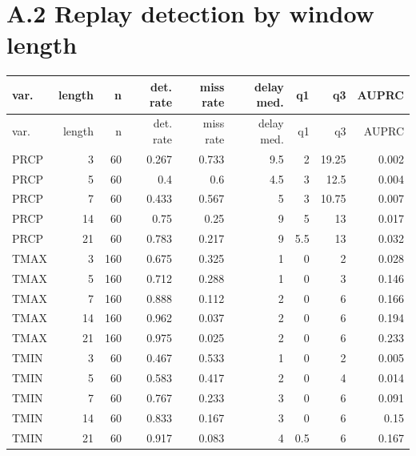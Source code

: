 \documentclass[10pt,a4paper]{article}
\begin{document}
\section*{A.2 Replay detection by window length}
{\small
\setlength{\tabcolsep}{3pt}
\setlength{\LTleft}{\fill}
\setlength{\LTright}{\fill}
\begin{longtable}{lrrrrrrrr}
\toprule
var. & length & n & det. rate & miss rate & delay med. & q1 & q3 & AUPRC \\
\midrule
\endfirsthead
\toprule
var. & length & n & det. rate & miss rate & delay med. & q1 & q3 & AUPRC \\
\midrule
\endhead
\bottomrule
\endlastfoot
PRCP & 3 & 60 & 0.267 & 0.733 & 9.5 & 2 & 19.25 & 0.002 \\
PRCP & 5 & 60 & 0.4 & 0.6 & 4.5 & 3 & 12.5 & 0.004 \\
PRCP & 7 & 60 & 0.433 & 0.567 & 5 & 3 & 10.75 & 0.007 \\
PRCP & 14 & 60 & 0.75 & 0.25 & 9 & 5 & 13 & 0.017 \\
PRCP & 21 & 60 & 0.783 & 0.217 & 9 & 5.5 & 13 & 0.032 \\
TMAX & 3 & 160 & 0.675 & 0.325 & 1 & 0 & 2 & 0.028 \\
TMAX & 5 & 160 & 0.712 & 0.288 & 1 & 0 & 3 & 0.146 \\
TMAX & 7 & 160 & 0.888 & 0.112 & 2 & 0 & 6 & 0.166 \\
TMAX & 14 & 160 & 0.962 & 0.037 & 2 & 0 & 6 & 0.194 \\
TMAX & 21 & 160 & 0.975 & 0.025 & 2 & 0 & 6 & 0.233 \\
TMIN & 3 & 60 & 0.467 & 0.533 & 1 & 0 & 2 & 0.005 \\
TMIN & 5 & 60 & 0.583 & 0.417 & 2 & 0 & 4 & 0.014 \\
TMIN & 7 & 60 & 0.767 & 0.233 & 3 & 0 & 6 & 0.091 \\
TMIN & 14 & 60 & 0.833 & 0.167 & 3 & 0 & 6 & 0.15 \\
TMIN & 21 & 60 & 0.917 & 0.083 & 4 & 0.5 & 6 & 0.167 \\
\end{longtable}
}
\end{document}
